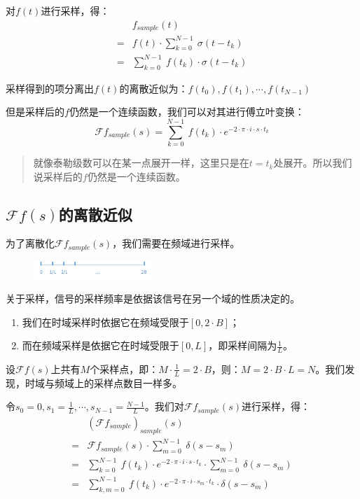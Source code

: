 对$f(t)$进行采样，得：
\begin{align*}
	  & f_{sample}(t)                                      \\
	= & f(t)\cdot \sum\limits_{k=0}^{N-1}\ \sigma(t-t_k)   \\
	= & \sum\limits_{k=0}^{N-1}\ f(t_k)\cdot \sigma(t-t_k)
\end{align*}

采样得到的项分离出$f(t)$的离散近似为：$f(t_0),f(t_1),\cdots,f(t_{N-1})$

但是采样后的$f$仍然是一个连续函数，我们可以对其进行傅立叶变换：
$$
	\mathcal{F}f_{sample}(s)=\sum\limits_{k=0}^{N-1}\ f(t_k)\cdot e^{-2\cdot \pi\cdot i\cdot s\cdot t_k}
$$
\begin{quote}
	就像泰勒级数可以在某一点展开一样，这里只是在$t=t_k$处展开。所以我们说采样后的$f$仍然是一个连续函数。
\end{quote}
\subsection{$\mathcal{F}f(s)$的离散近似}
为了离散化$\mathcal{F}f_{sample}(s)$，我们需要在频域进行采样。
\begin{figure}[H]
	\centering
	\includegraphics[width=0.4\textwidth]{assets/DFT2.png}
\end{figure}
关于采样，信号的采样频率是依据该信号在另一个域的性质决定的。
\begin{enumerate}
	\item 我们在时域采样时依据它在频域受限于$[0,2\cdot B]$；
	\item 而在频域采样是依据它在时域受限于$[0,L]$，即采样间隔为$\frac{1}{L}$。
\end{enumerate}


设$\mathcal{F}f(s)$上共有$M$个采样点，即：$M\cdot \frac{1}{L}=2\cdot B$，则：$M=2\cdot B\cdot L=N$。我们发现，时域与频域上的采样点数目一样多。

令$s_0=0,s_1=\frac{1}{L},\cdots,s_{N-1}=\frac{N-1}{L}$。我们对$\mathcal{F}f_{sample}(s)$进行采样，得：
\begin{align*}
	  & (\mathcal{F}f_{sample})_{sample}(s)                                                                                     \\
	= & \mathcal{F}f_{sample}(s)\cdot \sum\limits_{m=0}^{N-1}\ \delta(s-s_m)                                                    \\
	= & \sum\limits_{k=0}^{N-1}\ f(t_k)\cdot e^{-2\cdot \pi\cdot i\cdot s\cdot t_k}\cdot \sum\limits_{m=0}^{N-1}\ \delta(s-s_m) \\
	= & \sum\limits_{k,m=0}^{N-1}\ f(t_k)\cdot e^{-2\cdot \pi\cdot i\cdot s_m\cdot t_k}\cdot \delta(s-s_m)
\end{align*}

